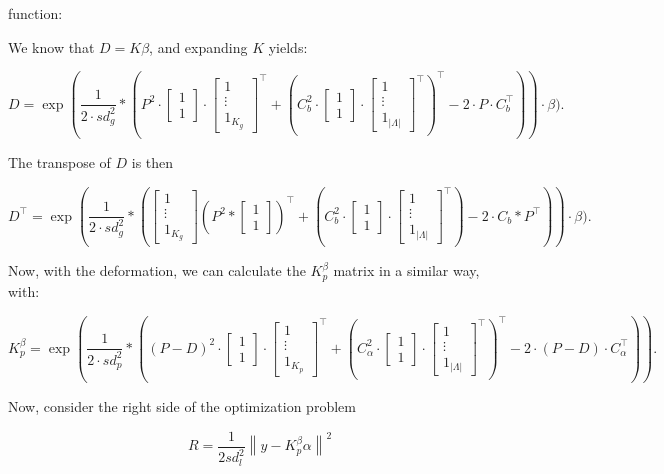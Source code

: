\documentclass[12pt]{article}
\newcommand{\A}{\alpha}
\newcommand{\B}{\beta}
\newcommand{\longones}[1]{
  \begin{bmatrix}
    1\\
    \vdots\\
    1_{#1}
  \end{bmatrix}
}
\begin{document}
 function:

We know that $D = K\beta$, and expanding $K$ yields:

\begin{dmath*}
  D = \exp\left(\frac{1}{2\cdot sd_g^2} * \left({P^{2}\cdot 
  \begin{bmatrix}
    1\\
    1
  \end{bmatrix} \cdot 
  \longones{K_g}^\top} 
  + {(C_b^{2}\cdot 
  \begin{bmatrix}
    1\\
    1
  \end{bmatrix}
  \cdot 
  \longones{|\Lambda|}
  ^\top )^\top} 
  -2\cdot P\cdot C_b^\top \right)  \right) \cdot \B).
\end{dmath*}

The transpose of $D$ is then


\begin{dmath*}
  D^\top = \exp\left(\frac{1}{2\cdot sd_g^2} * \left({\longones{K_g}
  \left(P^{2} *  
  \begin{bmatrix}
    1\\
    1
  \end{bmatrix} \right)^\top
  } 
  + {(C_b^{2}\cdot 
  \begin{bmatrix}
    1\\
    1
  \end{bmatrix}
  \cdot 
  \longones{|\Lambda|}
  ^\top )} 
  -2\cdot C_b * P ^\top \right)  \right) \cdot \B).
\end{dmath*}


Now, with the deformation, we can calculate the $K_p^\beta$ matrix in a similar way, with:

\begin{dmath*}
  K_p^\beta = \exp\left(\frac{1}{2\cdot sd_p^2} * \left({(P-D)^{2}\cdot 
  \begin{bmatrix}
    1\\
    1
  \end{bmatrix} \cdot 
  \longones{K_p}^\top} 
  + {(C_\A^{2}\cdot 
  \begin{bmatrix}
    1\\
    1
  \end{bmatrix}
  \cdot 
  \longones{|\Lambda|}
  ^\top )^\top} 
  -2\cdot (P-D)\cdot C_\A^\top \right)  \right).
\end{dmath*}

Now, consider the right side of the optimization problem

\begin{dmath*}
  R = \frac{1}{2sd_l^2} 
  \left\| 
  y - K_p^\B\A
  \right\|^2
\end{dmath*}
\end{document}
